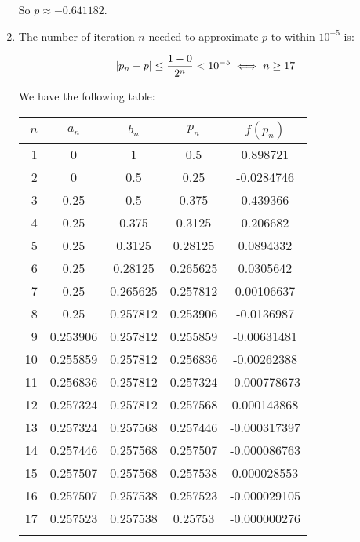 \documentclass[../../Assignments.tex]{subfiles}
\begin{document}
\begin{solution}
\begin{enumerate}[label=(\alph*)]
            So \(p \approx \num{-0.641182}\).

        \item The number of iteration \(n\) needed to approximate \(p\) to
            within \(10^{-5}\) is:

            \[\abs{p_n - p} \leq \frac{1 - 0}{2^n} < 10^{-5} \iff n \geq 17\]

            We have the following table:

            \begin{tabular}{r S[table-format=1.6] S[table-format=1.6] S[table-format=1.6] S[table-format=-1.9]}
                \\
                \toprule
                \(n\)  &  {\(a_n\)}  &  {\(b_n\)}  &  {\(p_n\)}  &  {\(f(p_n)\)}  \\
                  &  0          &  1          &  0.5        &   0.898721     \\
                    2  &  0          &  0.5        &  0.25       &  -0.0284746    \\
                    3  &  0.25       &  0.5        &  0.375      &   0.439366     \\
                    4  &  0.25       &  0.375      &  0.3125     &   0.206682     \\
                    5  &  0.25       &  0.3125     &  0.28125    &   0.0894332    \\
                    6  &  0.25       &  0.28125    &  0.265625   &   0.0305642    \\
                    7  &  0.25       &  0.265625   &  0.257812   &   0.00106637   \\
                    8  &  0.25       &  0.257812   &  0.253906   &  -0.0136987    \\
                    9  &  0.253906   &  0.257812   &  0.255859   &  -0.00631481   \\
                   10  &  0.255859   &  0.257812   &  0.256836   &  -0.00262388   \\
                   11  &  0.256836   &  0.257812   &  0.257324   &  -0.000778673  \\
                   12  &  0.257324   &  0.257812   &  0.257568   &   0.000143868  \\
                   13  &  0.257324   &  0.257568   &  0.257446   &  -0.000317397  \\
                   14  &  0.257446   &  0.257568   &  0.257507   &  -0.000086763  \\
                   15  &  0.257507   &  0.257568   &  0.257538   &   0.000028553  \\
                   16  &  0.257507   &  0.257538   &  0.257523   &  -0.000029105  \\
                   17  &  0.257523   &  0.257538   &  0.25753    &  -0.000000276  \\
                \bottomrule
                \\
            \end{tabular}


\end{enumerate}
\end{solution}
\end{document}
